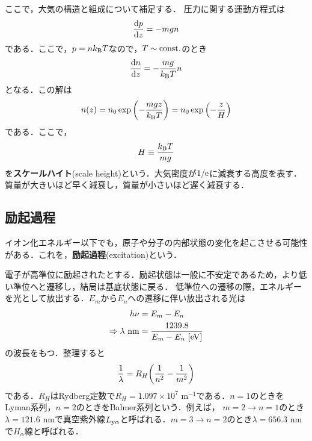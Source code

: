 \documentclass{report}
\begin{document}
ここで，大気の構造と組成について補足する．
圧力に関する運動方程式は
\begin{align}
  \dv{p}{z} = -mgn
\end{align}
である．ここで，$p=nk_{\mathrm{B}} T$なので，$T \sim \mathrm{const.}$のとき
\begin{align}
  \dv{n}{z} = - \frac{mg}{k_{\mathrm{B}} T}n
\end{align}
となる．この解は
\begin{align}
  n(z) = n_0 \exp\qty(-\frac{mgz}{k_{\mathrm{B}} T}) = n_0 \exp\qty(-\frac{z}{H})
\end{align}
である．ここで，
\begin{align}
  H \equiv \frac{k_{\mathrm{B}} T}{mg}
\end{align}
を\textbf{スケールハイト}(scale height)という．大気密度が$1/\mathrm{e}$に減衰する高度を表す．
質量が大きいほど早く減衰し，質量が小さいほど遅く減衰する．

\subsection{励起過程}
イオン化エネルギー以下でも，原子や分子の内部状態の変化を起こさせる可能性がある．これを，\textbf{励起過程}(excitation)という．

電子が高準位に励起されたとする．励起状態は一般に不安定であるため，より低い準位へと遷移し，結局は基底状態に戻る．
低準位への遷移の際，エネルギーを光として放出する．$E_m$から$E_n$への遷移に伴い放出される光は
\begin{align}
  h\nu &= E_m - E_n\\
  \Rightarrow \lambda\ \mathrm{nm} &= \frac{1239.8}{E_m - E_n\ [\mathrm{eV}]}
\end{align}
の波長をもつ．整理すると
\begin{align}
  \frac{1}{\lambda} = R_H\qty(\frac{1}{n^2} - \frac{1}{m^2})
\end{align}
である．$R_H$はRydberg定数で$R_H = 1.097 \times 10^7$ m$^{-1}$である．$n=1$のときをLyman系列，$n=2$のときをBalmer系列という．例えば，
$m=2\to n=1$のとき$\lambda = 121.6$ nmで真空紫外線$L_{\mathrm{y\alpha}}$と呼ばれる．$m=3\to n=2$のとき$\lambda = 656.3$ nmで$H_{\alpha}$線と呼ばれる．
\end{document}
